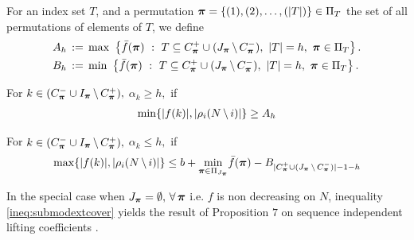\documentclass[10pt,twoside]{amsart}
\begin{document}
\begin{dfn}
 For an index set $T$, and a permutation $\boldsymbol\pi = \{(1),(2),\ldots, (|T|)\} \in \Pi_T$ the set of all permutations of elements of $T$, we define
  \begin{align}
         A_h & \define {\max}\,\,\set{\bar{f}(\bpi)}{T\subseteq C^+_{\bpi} \cup (J_{\bpi}\sm C^-_{\bpi}),\,\,|T| = h,\,\,\bpi \in \Pi_T}.\\ %
         B_h & \define {\min}\,\,\set{\bar{f}(\bpi)}{T\subseteq C^+_{\bpi} \cup (J_{\bpi}\sm C^-_{\bpi}),\,\,|T| = h,\,\,\bpi \in \Pi_T}. %
  \end{align}
\end{dfn}

\begin{prop}
  For $k\in (C^-_{\boldsymbol\pi} \cup I_{\boldsymbol\pi}\,\backslash\, C^+_{\boldsymbol\pi}),$ $\alpha_k \geq h,$ if
  \begin{align}
    \min\{|f(k)|,|\rho_{i}(N\,\backslash\, i)|\} \geq A_h
  \end{align}
\end{prop}

\begin{prop}
  For $k\in (C^-_{\boldsymbol\pi} \cup I_{\boldsymbol\pi}\,\backslash\, C^+_{\boldsymbol\pi}),$ $\alpha_k \leq h,$ if
  \begin{align}
    \max\{|f(k)|,|\rho_{i}(N\,\backslash\, i)|\} \leq b + \underset{\boldsymbol\pi \in \Pi_{J_{\boldsymbol\pi}}}{\min}\bar{f}(\boldsymbol\pi) - B_{|C^+_{\boldsymbol\pi} \cup (J_{\boldsymbol\pi}\,\backslash\, C^-_{\boldsymbol\pi})|-1-h}
  \end{align}
\end{prop}

\begin{rem}
  In the special case when $J_{\boldsymbol\pi} = \emptyset,\, \forall\, \boldsymbol\pi$ i.e. $f$ is non decreasing on $N$, inequality \eqref{ineq:submodextcover} yields the result of Proposition $7$ on sequence independent lifting coefficients \cite{Atamturk2009333}.
\end{rem}


\end{document}
